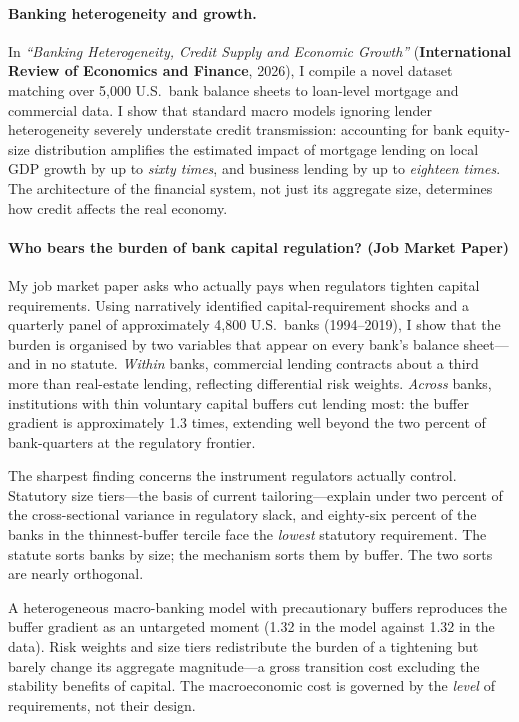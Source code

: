 \documentclass[12pt,a4paper]{article}
\begin{document}
\paragraph{Banking heterogeneity and growth.} In \textit{``Banking Heterogeneity, Credit Supply and Economic Growth''} (\textbf{International Review of Economics and Finance}, 2026), I compile a novel dataset matching over 5,000 U.S.\ bank balance sheets to loan-level mortgage and commercial data. I show that standard macro models ignoring lender heterogeneity severely understate credit transmission: accounting for bank equity-size distribution amplifies the estimated impact of mortgage lending on local GDP growth by up to \emph{sixty times}, and business lending by up to \emph{eighteen times}. The architecture of the financial system, not just its aggregate size, determines how credit affects the real economy.

\paragraph{Who bears the burden of bank capital regulation? (Job Market Paper)} My job market paper asks who actually pays when regulators tighten capital requirements. Using narratively identified capital-requirement shocks and a quarterly panel of approximately 4,800 U.S.\ banks (1994--2019), I show that the burden is organised by two variables that appear on every bank's balance sheet---and in no statute. \emph{Within} banks, commercial lending contracts about a third more than real-estate lending, reflecting differential risk weights. \emph{Across} banks, institutions with thin voluntary capital buffers cut lending most: the buffer gradient is approximately 1.3 times, extending well beyond the two percent of bank-quarters at the regulatory frontier.

The sharpest finding concerns the instrument regulators actually control. Statutory size tiers---the basis of current tailoring---explain under two percent of the cross-sectional variance in regulatory slack, and eighty-six percent of the banks in the thinnest-buffer tercile face the \emph{lowest} statutory requirement. The statute sorts banks by size; the mechanism sorts them by buffer. The two sorts are nearly orthogonal.

A heterogeneous macro-banking model with precautionary buffers reproduces the buffer gradient as an untargeted moment (1.32 in the model against 1.32 in the data). Risk weights and size tiers redistribute the burden of a tightening but barely change its aggregate magnitude---a gross transition cost excluding the stability benefits of capital. The macroeconomic cost is governed by the \emph{level} of requirements, not their design.
\end{document}
